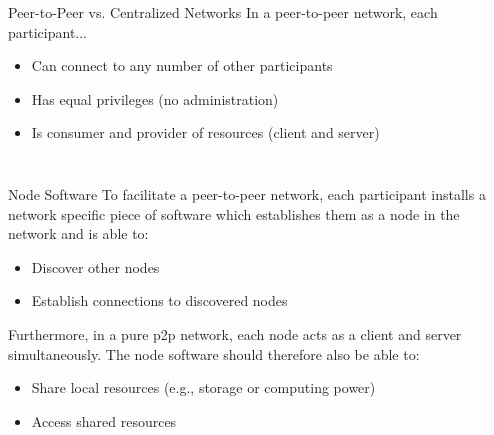\documentclass[handout]{beamer}
\begin{document}
\begin{frame}{Peer-to-Peer vs. Centralized Networks}
	\vspace{1em}
	In a peer-to-peer network, each participant...
	\vspace{0.5em}
		\begin{itemize}
			\item<2-> Can connect to any number of other participants
			\item<3-> Has equal privileges (no administration)
			\item<4-> Is consumer and provider of resources (client and server)
		\end{itemize}
	\begin{columns}[T]
		\begin{column}{0.5\textwidth}
			\vspace{2.5em}
			\begin{figure}
				
			\end{figure}
		\end{column}
		\begin{column}{0.5\textwidth}
			\begin{figure}
				
			\end{figure}
		\end{column}
	\end{columns}
\end{frame}

\begin{frame}{Node Software}
	To facilitate a peer-to-peer network, each participant installs a network specific piece of software which establishes them as a node in the network and is able to:
	\begin{itemize}
		\item Discover other nodes
		\item Establish connections to discovered nodes
	\end{itemize}
	\vspace{1em}
	Furthermore, in a pure p2p network, each node acts as a client and server simultaneously. The node software should therefore also be able to:
	\begin{itemize}
		\item Share local resources (e.g., storage or computing power)
		\item Access shared resources
	\end{itemize}
\end{frame}
\end{document}
